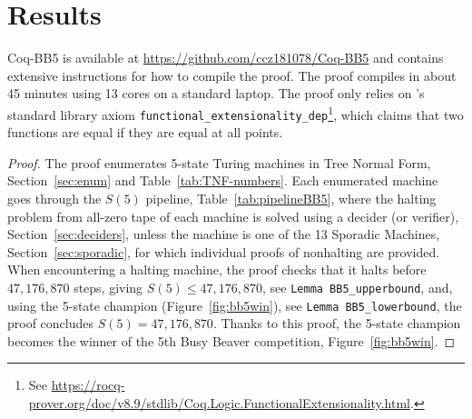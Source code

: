 \documentclass[a4paper,british]{article}
\theoremstyle{definition} %
\numberwithin{equation}{section}
\theoremstyle{definition} %
\newcommand{\numSporadic}{13\xspace}
\newcommand{\CoqBB}{Coq-BB5\xspace}
\begin{document}





% 

\newpage




\newpage


\newpage
\section{Results}\label{sec:results}

\CoqBB is available at \url{https://github.com/ccz181078/Coq-BB5} \cite{mxdys_2025_17061968} and contains extensive instructions for how to compile the proof. The proof compiles in about 45 minutes using 13 cores on a standard laptop. The proof only relies on \Coq's standard library axiom \texttt{functional\_extensionality\_dep}\footnote{See \url{https://rocq-prover.org/doc/v8.9/stdlib/Coq.Logic.FunctionalExtensionality.html}.}, which claims that two functions are equal if they are equal at all points.

\thBBTheFifth*
\begin{proof}
    The \Coq proof enumerates 5-state Turing machines in Tree Normal Form, Section~\ref{sec:enum} and Table~\ref{tab:TNF-numbers}. Each enumerated machine goes through the $S(5)$ pipeline, Table~\ref{tab:pipelineBB5}, where the halting problem from all-zero tape of each machine is solved using a decider (or verifier), Section~\ref{sec:deciders}, unless the machine is one of the \numSporadic Sporadic Machines, Section~\ref{sec:sporadic}, for which individual \Coq proofs of nonhalting are provided.
    When encountering a halting machine, the proof checks that it halts before $47{,}176{,}870$ steps, giving $S(5) \leq 47{,}176{,}870$, see \texttt{Lemma BB5\_upperbound}, and, using the 5-state champion (Figure~\ref{fig:bb5win}), see \texttt{Lemma BB5\_lowerbound}, the proof concludes $S(5) = 47{,}176{,}870$. Thanks to this proof, the 5-state champion becomes the winner of the 5th Busy Beaver competition, Figure~\ref{fig:bb5win}.
\end{proof}
\end{document}
